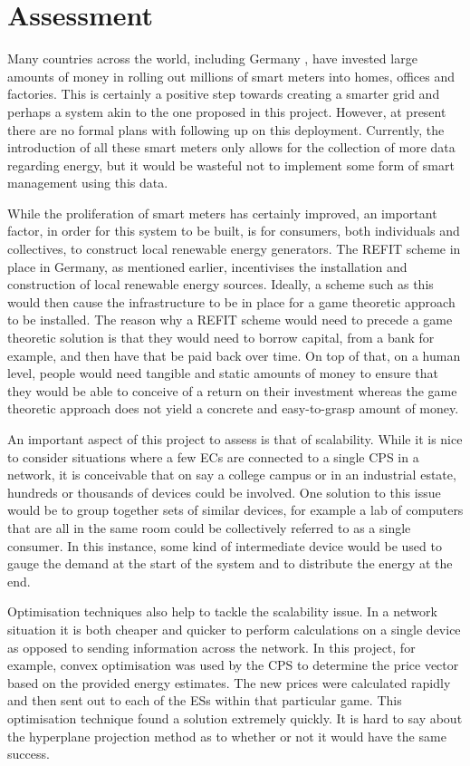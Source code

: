 \documentclass[a4paper, notitlepage]{report}
\begin{document}
\chapter{Assessment}
\label{sec:orga928254}
Many countries across the world, including Germany \cite{smartmetersgermany}, have
invested large amounts of money in rolling out millions of smart meters into
homes, offices and factories. This is certainly a positive step towards creating
a smarter grid and perhaps a system akin to the one proposed in this project.
However, at present there are no formal plans with following up on this
deployment. Currently, the introduction of all these smart meters only allows
for the collection of more data regarding energy, but it would be wasteful not
to implement some form of smart management using this data.

While the proliferation of smart meters has certainly improved, an important
factor, in order for this system to be built, is for consumers, both individuals
and collectives, to construct local renewable energy generators. The REFIT
scheme in place in Germany, as mentioned earlier, incentivises the installation
and construction of local renewable energy sources. Ideally, a scheme such as
this would then cause the infrastructure to be in place for a game theoretic
approach to be installed. The reason why a REFIT scheme would need to precede a
game theoretic solution is that they would need to borrow capital, from a bank
for example, and then have that be paid back over time. On top of that, on a
human level, people would need tangible and static amounts of money to ensure
that they would be able to conceive of a return on their investment whereas the
game theoretic approach does not yield a concrete and easy-to-grasp amount of
money.

An important aspect of this project to assess is that of scalability. While it
is nice to consider situations where a few ECs are connected to a single CPS in
a network, it is conceivable that on say a college campus or in an industrial
estate, hundreds or thousands of devices could be involved. One solution to this
issue would be to group together sets of similar devices, for example a lab of
computers that are all in the same room could be collectively referred to as a
single consumer. In this instance, some kind of intermediate device would be
used to gauge the demand at the start of the system and to distribute the energy
at the end.

Optimisation techniques also help to tackle the scalability issue. In a network
situation it is both cheaper and quicker to perform calculations on a single
device as opposed to sending information across the network. In this project,
for example, convex optimisation was used by the CPS to determine the price
vector based on the provided energy estimates. The new prices were calculated
rapidly and then sent out to each of the ESs within that particular game. This
optimisation technique found a solution extremely quickly. It is hard to say
about the hyperplane projection method as to whether or not it would have the
same success.
\end{document}
